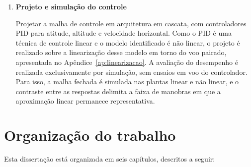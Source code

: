 \begin{enumerate}
    \item \textbf{Projeto e simulação do controle}

    Projetar a malha de controle em arquitetura em cascata, com controladores PID para atitude, altitude e velocidade horizontal. Como o PID é uma técnica de controle linear e o modelo identificado é não linear, o projeto é realizado sobre a linearização desse modelo em torno do voo pairado, apresentada no Apêndice~\ref{ap:linearizacao}. A avaliação do desempenho é realizada exclusivamente por simulação, sem ensaios em voo do controlador. Para isso, a malha fechada é simulada nas plantas linear e não linear, e o contraste entre as respostas delimita a faixa de manobras em que a aproximação linear permanece representativa.
\end{enumerate}

    


\section{Organização do trabalho}\label{sec:organizacao}
Esta dissertação está organizada em seis capítulos, descritos a seguir:

